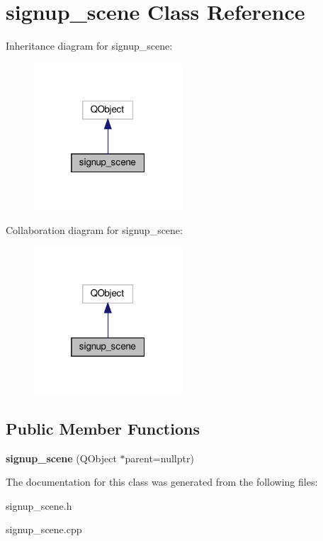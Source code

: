 \hypertarget{classsignup__scene}{}\section{signup\+\_\+scene Class Reference}
\label{classsignup__scene}


Inheritance diagram for signup\+\_\+scene\+:
\nopagebreak
\begin{figure}[H]
\begin{center}
\leavevmode
\includegraphics[width=157pt]{classsignup__scene__inherit__graph}
\end{center}
\end{figure}


Collaboration diagram for signup\+\_\+scene\+:
\nopagebreak
\begin{figure}[H]
\begin{center}
\leavevmode
\includegraphics[width=157pt]{classsignup__scene__coll__graph}
\end{center}
\end{figure}
\subsection*{Public Member Functions}
\begin{DoxyCompactItemize}
\item 
\mbox{\label{classsignup__scene_a451c908250948025fd79cfe2b9afb99c}} 
{\bfseries signup\+\_\+scene} (Q\+Object $\ast$parent=nullptr)
\end{DoxyCompactItemize}


The documentation for this class was generated from the following files\+:\begin{DoxyCompactItemize}
\item 
signup\+\_\+scene.\+h\item 
signup\+\_\+scene.\+cpp\end{DoxyCompactItemize}
